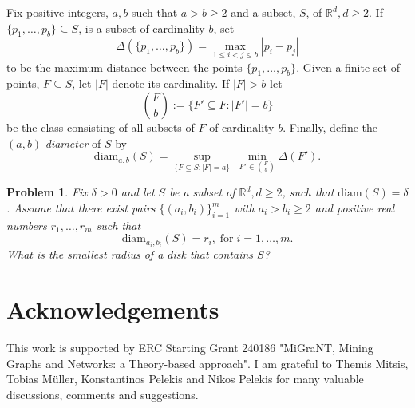 \documentclass[12pt]{article}
\newtheorem{prbl}[thm]{Problem}
\begin{document}
Fix positive integers, $a,b$ such that $a>b\geq 2$ and 
a subset, $S$, of $\mathbb{R}^d, d\geq 2$. If $\{p_1,\ldots,p_b\} \subseteq S$, is a subset of cardinality $b$, set
\[ \Delta(\{p_1,\ldots,p_b\}) = \max_{1\leq i<j\leq b} |p_i-p_j| \]
to be the maximum distance between the points $\{p_1,\ldots,p_b\}$.
Given a finite set of points, $F\subseteq S$, let $|F|$ denote its cardinality. If $|F|>b$ let 
\[ \binom{F}{b} := \{F'\subseteq F : |F'| =b \} \]
be the class consisting of all subsets of $F$ of cardinality $b$.
Finally, define the $(a,b)$-\emph{diameter} of $S$ by 
\[ \text{diam}_{a,b}(S) = \sup_{\{F\subseteq S: |F|=a\}}\;  \min_{F'\in\binom{F}{b}} \Delta(F') . \]

\begin{prbl} Fix $\delta>0$ and let $S$ be a subset of $\mathbb{R}^d,d\geq 2$, 
such that $\text{diam}(S)=\delta$. Assume that 
there exist pairs $\{(a_i,b_i)\}_{i=1}^{m}$ with $a_i>b_i\geq 2$
and positive real numbers $r_1,\ldots,r_m$ such that 
\[ \text{diam}_{a_i,b_i}(S) = r_i, \; \text{for} \; i=1,\ldots,m . \]
What is the smallest radius of a disk that contains $S$?
\end{prbl}

\section*{Acknowledgements} 
This work is supported by ERC Starting 
Grant 240186 "MiGraNT, Mining Graphs and Networks: a Theory-based approach". I am grateful to 
Themis Mitsis, Tobias M\"uller, Konstantinos Pelekis and 
Nikos Pelekis for many valuable discussions, comments and suggestions.
\end{document}
